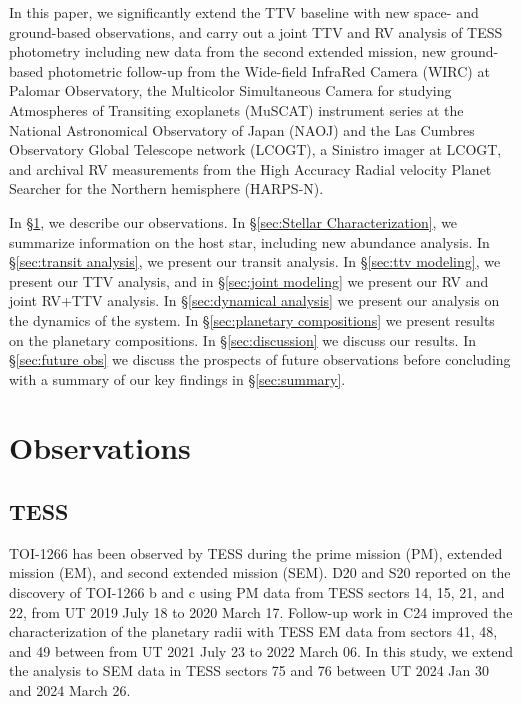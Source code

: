 \documentclass[twocolumn]{aastex631}
\begin{document}
In this paper, we significantly extend the TTV baseline with new space- and ground-based observations, and carry out a joint TTV and RV analysis of TESS photometry including new data from the second extended mission, new ground-based photometric follow-up from the Wide-field InfraRed Camera (WIRC) at Palomar Observatory, the Multicolor Simultaneous Camera for studying Atmospheres of Transiting exoplanets (MuSCAT) instrument series at the National Astronomical Observatory of Japan (NAOJ) and the Las Cumbres Observatory Global Telescope network (LCOGT), a Sinistro imager at LCOGT, and archival RV measurements from the High Accuracy Radial velocity Planet Searcher for the Northern hemisphere (HARPS-N). 

In \S\ref{sec:Observations}, we describe our observations. In \S\ref{sec:Stellar Characterization}, we summarize information on the host star, including new abundance analysis. In \S\ref{sec:transit analysis}, we present our transit analysis. In \S\ref{sec:ttv modeling}, we present our TTV analysis, and in \S\ref{sec:joint modeling} we present our RV and joint RV+TTV analysis. In \S\ref{sec:dynamical analysis} we present our analysis on the dynamics of the system. In \S\ref{sec:planetary compositions} we present results on the planetary compositions. In \S\ref{sec:discussion} we discuss our results. In \S\ref{sec:future obs} we discuss the prospects of future observations before concluding with a summary of our key findings in \S\ref{sec:summary}.


\section{Observations} \label{sec:Observations}

\subsection{TESS}

TOI-1266 has been observed by TESS during the prime mission (PM), extended mission (EM), and second extended mission (SEM). D20 and S20 reported on the discovery of TOI-1266 b and c using PM data from TESS sectors 14, 15, 21, and 22, from UT 2019 July 18 to 2020 March 17. Follow-up work in C24 improved the characterization of the planetary radii with TESS EM data from sectors 41, 48, and 49 between from UT 2021 July 23 to 2022 March 06. In this study, we extend the analysis to SEM data in TESS sectors 75 and 76 between UT 2024 Jan 30 and 2024 March 26.
\end{document}
